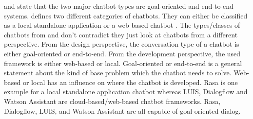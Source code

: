 \citet{williams2017hybrid} and \citet{bordes2016learning} state that the two major chatbot types are goal-oriented and end-to-end systems.
\citet{kane2016role} defines two different categories of chatbots.
They can either be classified as a local standalone application or a web-based chatbot \cite{kane2016role}.
The types/classes of chatbots from \citet{williams2017hybrid, bordes2016learning} and \citet{kane2016role} 
don't contradict they just look at chatbots from a different perspective.
From the design perspective, the conversation type of a chatbot is either goal-oriented or end-to-end.
From the development perspective, the used framework is either web-based or local.
Goal-oriented or end-to-end is a general statement about the kind of base problem which the chatbot needs to solve.
Web-based or local has an influence on where the chatbot is developed.
Rasa is one example for a local standalone application chatbot whereas LUIS, 
Dialogflow and Watson Assistant are cloud-based/web-based chatbot frameworks.
Rasa, Dialogflow, LUIS, and Watson Assistant are all capable of goal-oriented dialog.


